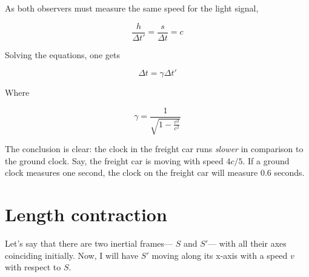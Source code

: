 \documentclass[12pt]{article}
\begin{document}
\begin{center}
\end{center}

As both observers must measure the same speed
for the light signal,

\[\frac{h}{\Delta t'} = \frac{s}{\Delta t} = c\]

Solving the equations, one gets 

\[\Delta t = \gamma \Delta t'\]

Where 

\[\gamma = \frac{1}{\sqrt{1-\frac{v^2}{c^2}}}\]

The conclusion is clear: the clock in the freight car runs \textit{slower}
in comparison to the ground clock. Say, the freight car is moving with speed $4c/5$. 
If a ground clock measures one second, the clock on the freight car will measure 0.6 seconds. 
\section{Length contraction}
Let's say that there are two inertial frames--- $S$ and $S'$--- with all their axes coinciding initially. Now, I will have 
$S'$ moving along its x-axis with a speed $v$ with respect to $S$.
\end{document}
